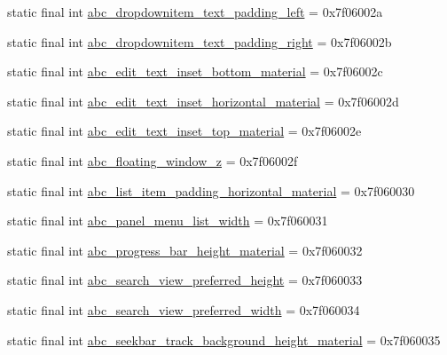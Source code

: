 \begin{DoxyCompactItemize}
static final int \mbox{\hyperlink{classandroid_1_1support_1_1design_1_1_r_1_1dimen_a968fc63b6429432c490e18cf8e1ae698}{abc\+\_\+dropdownitem\+\_\+text\+\_\+padding\+\_\+left}} = 0x7f06002a
\item 
static final int \mbox{\hyperlink{classandroid_1_1support_1_1design_1_1_r_1_1dimen_aeec29d97219b2c603cdeb98e26965a7a}{abc\+\_\+dropdownitem\+\_\+text\+\_\+padding\+\_\+right}} = 0x7f06002b
\item 
static final int \mbox{\hyperlink{classandroid_1_1support_1_1design_1_1_r_1_1dimen_a0985e21f84e746dec037773a3abb1113}{abc\+\_\+edit\+\_\+text\+\_\+inset\+\_\+bottom\+\_\+material}} = 0x7f06002c
\item 
static final int \mbox{\hyperlink{classandroid_1_1support_1_1design_1_1_r_1_1dimen_aedd7d9d99b8c4f081a9582ae33e056c4}{abc\+\_\+edit\+\_\+text\+\_\+inset\+\_\+horizontal\+\_\+material}} = 0x7f06002d
\item 
static final int \mbox{\hyperlink{classandroid_1_1support_1_1design_1_1_r_1_1dimen_ac9ec7c237aed1411b8bf85d1f2de801b}{abc\+\_\+edit\+\_\+text\+\_\+inset\+\_\+top\+\_\+material}} = 0x7f06002e
\item 
static final int \mbox{\hyperlink{classandroid_1_1support_1_1design_1_1_r_1_1dimen_a7c730cc453da03509011d0f75524689a}{abc\+\_\+floating\+\_\+window\+\_\+z}} = 0x7f06002f
\item 
static final int \mbox{\hyperlink{classandroid_1_1support_1_1design_1_1_r_1_1dimen_a2876e7547b2e4660135953655f79ff25}{abc\+\_\+list\+\_\+item\+\_\+padding\+\_\+horizontal\+\_\+material}} = 0x7f060030
\item 
static final int \mbox{\hyperlink{classandroid_1_1support_1_1design_1_1_r_1_1dimen_a365e3bc959933ee12d8b935ea42253de}{abc\+\_\+panel\+\_\+menu\+\_\+list\+\_\+width}} = 0x7f060031
\item 
static final int \mbox{\hyperlink{classandroid_1_1support_1_1design_1_1_r_1_1dimen_af760291af5481fd29ed5b6c6a65c8033}{abc\+\_\+progress\+\_\+bar\+\_\+height\+\_\+material}} = 0x7f060032
\item 
static final int \mbox{\hyperlink{classandroid_1_1support_1_1design_1_1_r_1_1dimen_a1e5ec451633a8be5193491dd98660a83}{abc\+\_\+search\+\_\+view\+\_\+preferred\+\_\+height}} = 0x7f060033
\item 
static final int \mbox{\hyperlink{classandroid_1_1support_1_1design_1_1_r_1_1dimen_a6901ca34b7cc25c725a55d9973e6c0c5}{abc\+\_\+search\+\_\+view\+\_\+preferred\+\_\+width}} = 0x7f060034
\item 
static final int \mbox{\hyperlink{classandroid_1_1support_1_1design_1_1_r_1_1dimen_a074860b4cf4b4198303c60e7b2efd3cc}{abc\+\_\+seekbar\+\_\+track\+\_\+background\+\_\+height\+\_\+material}} = 0x7f060035

\end{DoxyCompactItemize}
